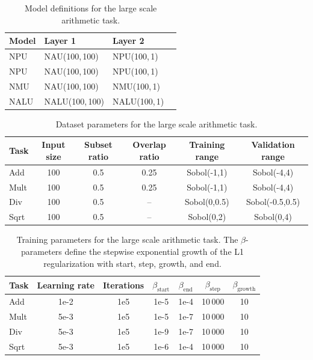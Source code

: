 \documentclass[9pt]{article}
\begin{document}
\begin{table}[h]
  \centering
  \caption{Model definitions for the large scale arithmetic task.}
  \label{tab:models_large_task}
  \begin{tabular}{llll}
    \toprule
    Model & Layer 1 & Layer 2\\
    \midrule
    NPU & NAU(100,\,100) & NPU(100,\,1) \\
    NPU & NAU(100,\,100) & NPU(100,\,1) \\
    NMU & NAU(100,\,100) & NMU(100,\,1) \\
    NALU & NALU(100,\,100) & NALU(100,\,1) \\
    \bottomrule
  \end{tabular}
\end{table}


\begin{table}[h]
  \centering
  \caption{Dataset parameters for the large scale arithmetic task.}
  \label{tab:dataset_params_large_scale}
  \begin{tabular}{lccccc}
    \toprule
    Task & Input size & Subset ratio & Overlap ratio & Training range  & Validation range\\
    \midrule
    Add  & 100        & 0.5          & 0.25          & Sobol(-1,1)     & Sobol(-4,4) \\
    Mult & 100        & 0.5          & 0.25          & Sobol(-1,1)     & Sobol(-4,4)\\
    Div  & 100        & 0.5          & --            & Sobol(0,0.5)    & Sobol(-0.5,0.5) \\
    Sqrt & 100        & 0.5          & --            & Sobol(0,2)      & Sobol(0,4) \\
    \bottomrule
  \end{tabular}
\end{table}

\begin{table}[h]
  \centering
  \caption{Training parameters for the large scale arithmetic task. The
  $\beta$-parameters define the stepwise exponential growth of the L1
  regularization with start, step, growth, and end.}
  \label{tab:training_large_scale}
  \begin{tabular}{lcccccc}
    \toprule
    Task & Learning rate & Iterations & $\beta_{\text{start}}$ &
      $\beta_{\text{end}}$ & $\beta_{\text{step}}$  & $\beta_{\text{growth}}$ \\
    \midrule
    Add  & 1e-2 & 1e5 & 1e-5 & 1e-4 & 10\,000 & 10 \\
    Mult & 5e-3 & 1e5 & 1e-5 & 1e-7 & 10\,000 & 10 \\
    Div  & 5e-3 & 1e5 & 1e-9 & 1e-7 & 10\,000 & 10 \\
    Sqrt & 5e-3 & 1e5 & 1e-6 & 1e-4 & 10\,000 & 10 \\
    \bottomrule
  \end{tabular}
\end{table}
\end{document}
